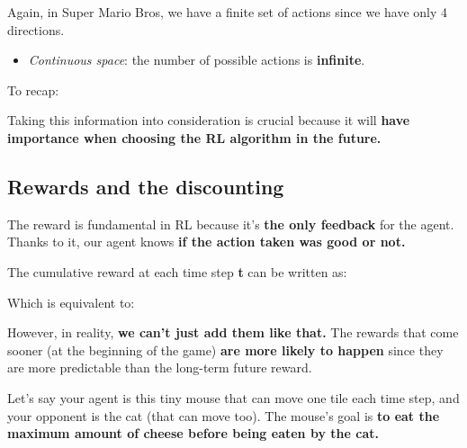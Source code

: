 \documentclass[11pt,a4paper]{article}
\begin{document}

Again, in Super Mario Bros, we have a finite set of actions since we have only 4 directions.

\begin{itemize}
\tightlist
\item
  \emph{Continuous space}: the number of possible actions is \textbf{infinite}.
\end{itemize}


To recap:


Taking this information into consideration is crucial because it will \textbf{have importance when choosing the RL algorithm in the future.}

\subsection{Rewards and the discounting}\label{rewards-and-the-discounting}

The reward is fundamental in RL because it's \textbf{the only feedback} for the agent. Thanks to it, our agent knows \textbf{if the action taken was good or not.}

The cumulative reward at each time step \textbf{t} can be written as:


Which is equivalent to:


However, in reality, \textbf{we can't just add them like that.} The rewards that come sooner (at the beginning of the game) \textbf{are more likely to happen} since they are more predictable than the long-term future reward.

Let's say your agent is this tiny mouse that can move one tile each time step, and your opponent is the cat (that can move too). The mouse's goal is \textbf{to eat the maximum amount of cheese before being eaten by the cat.}
\end{document}
